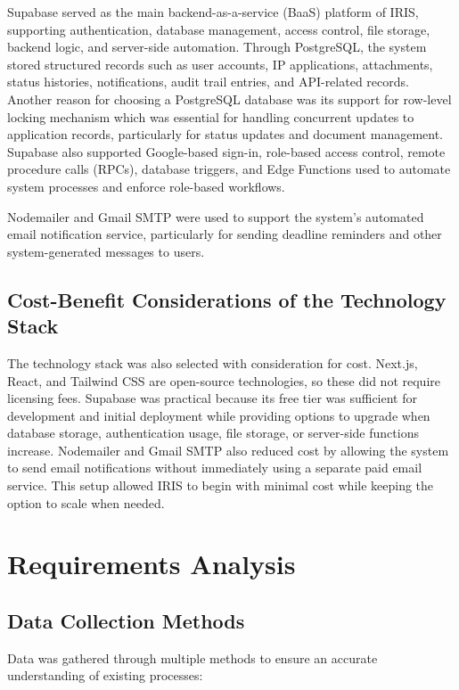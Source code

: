 Supabase served as the main backend-as-a-service (BaaS) platform of IRIS, supporting authentication, database management, access control, file storage, backend logic, and server-side automation. 
Through PostgreSQL, the system stored structured records such as user accounts, IP applications, attachments, status histories, notifications, audit trail entries, and API-related records. 
Another reason for choosing a PostgreSQL database was its support for row-level locking mechanism which was essential for handling concurrent updates to application records, particularly for status updates and document management.
Supabase also supported Google-based sign-in, role-based access control, remote procedure calls (RPCs), database triggers, and Edge Functions used to automate system processes and enforce role-based workflows.



Nodemailer and Gmail SMTP were used to support the system's automated email notification service, particularly for sending deadline reminders and other system-generated messages to users.

\subsection{Cost-Benefit Considerations of the Technology Stack}

The technology stack was also selected with consideration for cost. Next.js, React, and Tailwind CSS are open-source technologies, so these did not require licensing fees. 
Supabase was practical because its free tier was sufficient for development and initial deployment while providing options to upgrade when database storage, authentication usage, file storage, or server-side functions increase. Nodemailer and Gmail SMTP also reduced cost by allowing the system to send email notifications without immediately using a separate paid email service. This setup allowed IRIS to begin with minimal cost while keeping the option to scale when needed.

\section{Requirements Analysis}

\subsection{Data Collection Methods}

Data was gathered through multiple methods to ensure an accurate understanding of existing processes:

